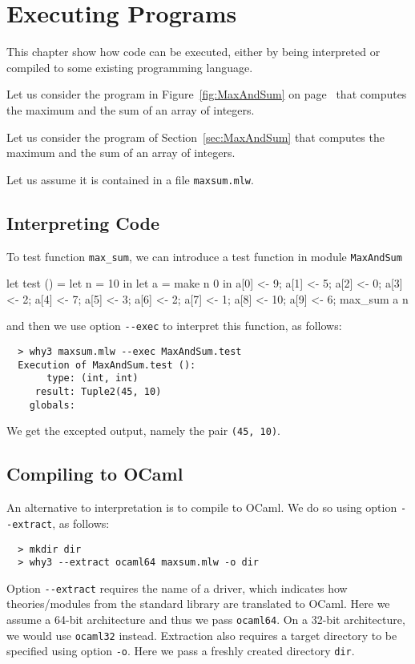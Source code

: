 
\chapter{Executing \whyml Programs}
\label{chap:exec}

This chapter show how \whyml code can be executed, either by being
interpreted or compiled to some existing programming language.

\begin{latexonly}
Let us consider the program in Figure~\ref{fig:MaxAndSum}
on page~\pageref{fig:MaxAndSum} that computes the maximum and the sum
of an array of integers.
\end{latexonly}
\begin{htmlonly}
Let us consider the program of Section~\ref{sec:MaxAndSum} that computes
the maximum and the sum of an array of integers.
\end{htmlonly}
Let us assume it is contained in a file \texttt{maxsum.mlw}.

\section{Interpreting \whyml Code}

To test function \texttt{max\_sum}, we can introduce a \whyml test function
in module \texttt{MaxAndSum}
\begin{whycode}
  let test () =
    let n = 10 in
    let a = make n 0 in
    a[0] <- 9; a[1] <- 5; a[2] <- 0; a[3] <- 2;  a[4] <- 7;
    a[5] <- 3; a[6] <- 2; a[7] <- 1; a[8] <- 10; a[9] <- 6;
    max_sum a n
\end{whycode}
and then we use option \verb+--exec+ to interpret this function,
as follows:
\begin{verbatim}
  > why3 maxsum.mlw --exec MaxAndSum.test
  Execution of MaxAndSum.test ():
       type: (int, int)
     result: Tuple2(45, 10)
    globals:
\end{verbatim}
We get the excepted output, namely the pair \texttt{(45, 10)}.

\section{Compiling \whyml to OCaml}

An alternative to interpretation is to compile \whyml to OCaml.
We do so using option \verb+--extract+, as follows:
\begin{verbatim}
  > mkdir dir
  > why3 --extract ocaml64 maxsum.mlw -o dir
\end{verbatim}
Option \verb+--extract+ requires the name of a driver, which indicates
how theories/modules from the \why standard library are translated to
OCaml. Here we assume a 64-bit architecture and thus we pass
\texttt{ocaml64}. On a 32-bit architecture, we would use
\texttt{ocaml32} instead. Extraction also requires a target directory
to be specified using option \verb+-o+. Here we pass a freshly created
directory \texttt{dir}.

